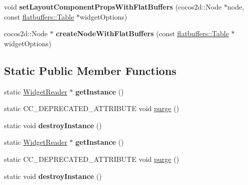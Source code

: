 \begin{DoxyCompactItemize}
\item 
\mbox{\label{classcocostudio_1_1WidgetReader_a21e4598ba0d37aed66fb50baa6d3f741}} 
void {\bfseries set\+Layout\+Component\+Props\+With\+Flat\+Buffers} (cocos2d\+::\+Node $\ast$node, const \hyperlink{classflatbuffers_1_1Table}{flatbuffers\+::\+Table} $\ast$widget\+Options)
\item 
\mbox{\label{classcocostudio_1_1WidgetReader_acead0cc622d2877ba671584a5aa2f4bd}} 
cocos2d\+::\+Node $\ast$ {\bfseries create\+Node\+With\+Flat\+Buffers} (const \hyperlink{classflatbuffers_1_1Table}{flatbuffers\+::\+Table} $\ast$widget\+Options)
\end{DoxyCompactItemize}
\subsection*{Static Public Member Functions}
\begin{DoxyCompactItemize}
\item 
\mbox{\label{classcocostudio_1_1WidgetReader_ae76e670b88a83155d7a7bee331ec4594}} 
static \hyperlink{classcocostudio_1_1WidgetReader}{Widget\+Reader} $\ast$ {\bfseries get\+Instance} ()
\item 
static C\+C\+\_\+\+D\+E\+P\+R\+E\+C\+A\+T\+E\+D\+\_\+\+A\+T\+T\+R\+I\+B\+U\+TE void \hyperlink{classcocostudio_1_1WidgetReader_af7aea963e2dc8f4d07adbd8db2f64e00}{purge} ()
\item 
\mbox{\label{classcocostudio_1_1WidgetReader_a86c2fcc740e41e5ddc3b1eec2da4d65c}} 
static void {\bfseries destroy\+Instance} ()
\item 
\mbox{\label{classcocostudio_1_1WidgetReader_a5c276c5cf3309c33ccd0813c9b03b776}} 
static \hyperlink{classcocostudio_1_1WidgetReader}{Widget\+Reader} $\ast$ {\bfseries get\+Instance} ()
\item 
static C\+C\+\_\+\+D\+E\+P\+R\+E\+C\+A\+T\+E\+D\+\_\+\+A\+T\+T\+R\+I\+B\+U\+TE void \hyperlink{classcocostudio_1_1WidgetReader_a574f9b984629a98a258ff0c767e7b6ba}{purge} ()
\item 
\mbox{\label{classcocostudio_1_1WidgetReader_a3731d53090d452b5f62329c86369652d}} 
static void {\bfseries destroy\+Instance} ()
\end{DoxyCompactItemize}
